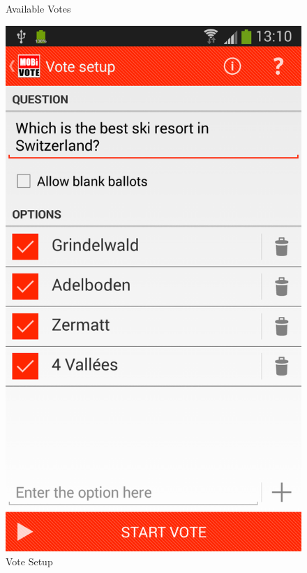 \documentclass[numbers=noenddot, abstract=on, a4paper, headsepline,
footsepline, oneside, draft=off]{scrreprt}
\begin{document}
\begin{figure}[!htb]
\begin{minipage}{.5\textwidth}
		\caption{Available Votes}
		\label{fig:handbook_votes}
	\end{minipage}
	\begin{minipage}{.5\textwidth}
  		\centering
		\includegraphics[height=.4\textheight]{img/screenshots/vote_details}
		\caption{Vote Setup}
		\label{fig:handbook_votesetup}
	\end{minipage}
\end{figure}
\end{document}

